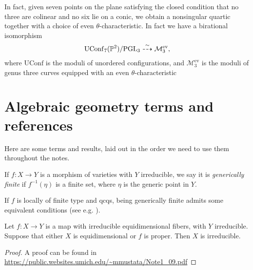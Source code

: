 \documentclass[11pt]{amsart}
\providecommand{\UConf}{\mathrm{UConf}}
\begin{document}
In fact, given seven points on the plane satisfying the closed condition that no three are colinear and no six lie on a conic, we obtain a nonsingular quartic together with a choice of even $\theta$-characteristic. In fact we have a birational isomorphism
\begin{align*}
    \UConf_7(\P^2)/\PGL_3 \overset{\sim}{\dashto} \mathcal{M}_3^\text{ev},
\end{align*}
where $\UConf$ is the moduli of unordered configurations, and $\mathcal{M}_3^\text{ev}$ is the moduli of genus three curves equipped with an even $\theta$-characteristic \cite[6.3.12]{Dolgachev}


\appendix
\section{Algebraic geometry terms and references}

Here are some terms and results, laid out in the order we need to use them throughout the notes.

\begin{definition}
\label{def:generically-finite}
If $f \colon X \to Y$ is a morphism of varieties with $Y$ irreducible, we say it is \textit{generically finite} if $f^{-1}(\eta)$ is a finite set, where $\eta$ is the generic point in $Y$.
\end{definition}

\begin{remark} If $f$ is locally of finite type and qcqs, being generically finite admits some equivalent conditions (see e.g. \cite[02NW]{Stacks}).
\end{remark}

\begin{proposition}\label{prop:irred-criterion}
Let $f\colon X\to Y$ is a map with irreducible equidimensional fibers, with $Y$ irreducible. Suppose that either $X$ is equidimensional or $f$ is proper. Then $X$ is irreducible.
\end{proposition}
\begin{proof} A proof can be found in \url{https://public.websites.umich.edu/~mmustata/Note1_09.pdf}
\end{proof}




\printbibliography
\end{document}
